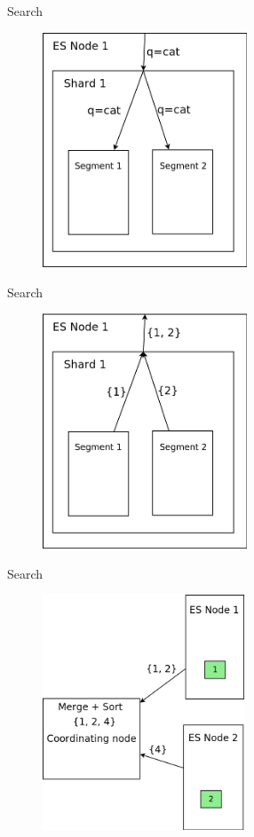 \documentclass{beamer}
\begin{document}
\begin{frame}{Search}
	\begin{figure}
		\includegraphics[width=\textwidth,height=7cm,keepaspectratio=true]{search5}
	\end{figure}
\end{frame}
\begin{frame}{Search}
	\begin{figure}
		\includegraphics[width=\textwidth,height=7cm,keepaspectratio=true]{search6}
	\end{figure}
\end{frame}
\begin{frame}{Search}
	\begin{figure}
		\includegraphics[width=\textwidth,height=7cm,keepaspectratio=true]{search2}
	\end{figure}
\end{frame}
\end{document}
